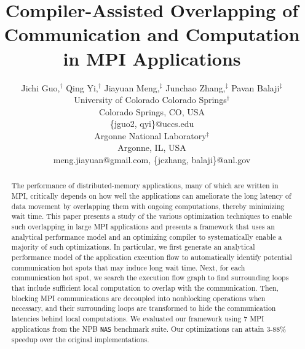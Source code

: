 \documentclass[10pt,doublecolumn,conference]{IEEEtran}
\begin{document}
%
%
\title{Compiler-Assisted Overlapping of Communication and Computation in MPI Applications}

\author{Jichi Guo,$^\dag$ Qing Yi,$^\dag$ Jiayuan Meng,$^\ddag$ Junchao Zhang,$^\ddag$ Pavan Balaji$^\ddag$\\
University of Colorado Colorado Springs$^\dag$\\
Colorado Springs, CO, USA\\
\{jguo2, qyi\}@uccs.edu \\
Argonne National Laboratory$^\ddag$\\
Argonne, IL, USA\\
meng.jiayuan@gmail.com, \{jczhang, balaji\}@anl.gov
}

\maketitle

\begin{abstract}
The performance of distributed-memory applications, many of which are
written in MPI, critically depends on how well the applications can
ameliorate the long latency of data movement by overlapping
them with ongoing computations, thereby minimizing wait time.  This
paper presents a study of the various optimization techniques to
enable such overlapping in large MPI applications and presents a
framework that uses an analytical performance model and an optimizing compiler
to systematically enable a majority of such optimizations.  In particular, we first generate an
analytical performance model of the application execution flow to automatically identify potential communication hot spots
that may induce long wait time.  Next, for each communication hot
spot, we search the execution flow graph to find surrounding loops that
include sufficient local computation to overlap with the
communication.  Then, blocking MPI communications are decoupled into
nonblocking operations when necessary, and their surrounding loops are
transformed to hide the communication latencies behind local
computations.  We evaluated our framework using 7 MPI applications
from the NPB \texttt{NAS} benchmark suite.  Our optimizations can attain
3-88\% speedup over the original implementations.
\end{abstract}


\end{document}
